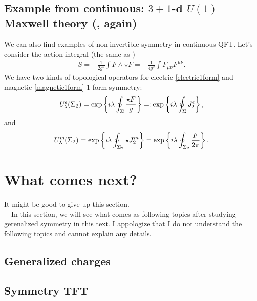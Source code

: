 \documentclass{ltjsarticle}
\theoremstyle{mystyle} %
\numberwithin{equation}{section}
\begin{document}
\subsection{Example from continuous: $3+1$-d $U(1)$ Maxwell theory (, again)}
We can also find examples of non-invertible symmetry in continuous QFT. 
Let's consider the action integral (the same as \label{U1pure})
\begin{align}
    S = -\frac{1}{2g^2} \int F\wedge \star F = -\frac{1}{4g^2}\int F_{\mu\nu}F^{\mu\nu}. 
\end{align}
We have two kinds of topological operators for electric \eqref{electric1form} and magnetic \eqref{magnetic1form}
$1$-form symmetry: 
\begin{align}
    U^{e}_{\lambda}(\Sigma_2) = \exp\left\{{i\lambda\oint_{\Sigma}\frac{\star F}{g}}\right\}=: \exp\left\{{i\lambda\oint_{\Sigma}J^e_2}\right\}, 
\end{align}
and 
\begin{align}
    U^{m}_\lambda(\Sigma_2) = \exp\left\{{i\lambda\oint_{\Sigma_2}\star J^m_2}\right\}
    =\exp\left\{{i\lambda\oint_{\Sigma_2}\frac{F}{2\pi}}\right\}. 
 \end{align}
\newpage
\section{What comes next?}
\color{red}
It might be good to give up this section. \\
\color{black}
　In this section, we will see what comes as following topics after studying gerenalized symmetry in this text. 
I appologize that I do not understand the following topics and cannot explain any details. 
\subsection{Generalized charges}
\subsection{Symmetry TFT}
\newpage
\end{document}
